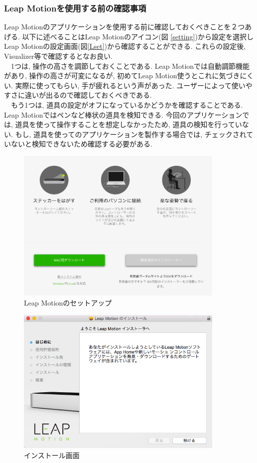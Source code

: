 \documentclass{funthesis}
\begin{document}
\subsubsection{Leap Motionを使用する前の確認事項}
Leap Motionのアプリケーションを使用する前に確認しておくべきことを２つあげる. 以下に述べることはLeap Motionのアイコン(図 \ref{setting})から設定を選択しLeap Motionの設定画面(図\ref{Lset})から確認することができる. これらの設定後, Visualizer等で確認するとなお良い. \\
　1つは, 操作の高さを調節しておくことである. Leap Motionでは自動調節機能があり, 操作の高さが可変になるが, 初めてLeap Motion使うとこれに気づきにくい. 実際に使ってもらい, 手が疲れるという声があった. ユーザーによって使いやすさに違いが出るので確認しておくべきである. \\
　もう1つは, 道具の設定がオフになっているかどうかを確認することである. Leap Motionではペンなど棒状の道具を検知できる. 今回のアプリケーションでは, 道具を使って操作することを想定しなかったため, 道具の検知を行っていない. もし, 道具を使ってのアプリケーションを製作する場合では, チェックされていないと検知できないため確認する必要がある. \\

\begin{figure}[H]
 \begin{center}
  \includegraphics[width=100mm]{./img/setup.png}
 \end{center}
 \caption{Leap Motionのセットアップ}
 \label{setup}
\end{figure}

\begin{figure}[H]
 \begin{center}
  \includegraphics[width=100mm]{./img/installer.png}
 \end{center}
 \caption{インストール画面}
 \label{install}
\end{figure}
\end{document}
